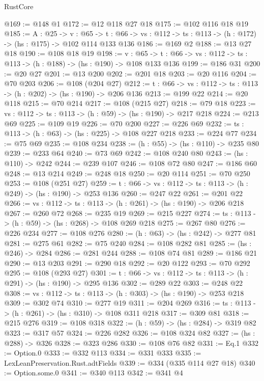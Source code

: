 \begin{lexlean}{RustCore}
\begin{coremodule}
@169 := @148 @1
@172 := @12 @118 @27 @18
@175 := @102 @116 @18 @19
@185 := {A : @25} ->
  {v : @65} ->
  {t : @66} -> {vs : @112} -> {ts : @113} -> (h : @172) -> (hs : @175) -> @102 @114 @133 @136
@186 := @169 @2
@188 := @13 @27 @18
@190 := @108 @18 @19
@198 := {v : @65} ->
  {t : @66} -> {vs : @112} -> {ts : @113} -> (h : @188) -> (hs : @190) -> @108 @133 @136
@199 := @186 @31
@200 := @20 @27
@201 := @13 @200
@202 := @201 @18
@203 := @20 @116
@204 := @70 @203
@206 := @108 (@204 @27)
@212 := {t : @66} -> {vs : @112} -> {ts : @113} -> (h : @202) -> (hs : @190) -> @206 @136
@213 := @199 @22
@214 := @20 @118
@215 := @70 @214
@217 := @108 (@215 @27)
@218 := @79 @18
@223 := {vs : @112} -> {ts : @113} -> (h : @59) -> (hs : @190) -> @217 @218
@224 := @213 @69
@225 := @109 @19
@226 := @70 @200
@227 := @226 @69
@232 := {ts : @113} -> (h : @63) -> (hs : @225) -> @108 @227 @218
@233 := @224 @77
@234 := @75 @69
@235 := @108 @234
@238 := (h : @55) -> (hs : @110) -> @235 @80
@239 := @233 @64
@240 := @73 @69
@242 := @108 @240 @80
@243 := (hs : @110) -> @242
@244 := @239 @107
@246 := @108 @72 @80
@247 := @186 @60
@248 := @13 @214
@249 := @248 @18
@250 := @20 @114
@251 := @70 @250
@253 := @108 (@251 @27)
@259 := {t : @66} -> {vs : @112} -> {ts : @113} -> (h : @249) -> (hs : @190) -> @253 @136
@260 := @247 @22
@261 := @201 @22
@266 := {vs : @112} -> {ts : @113} -> (h : @261) -> (hs : @190) -> @206 @218
@267 := @260 @72
@268 := @235 @19
@269 := @215 @227
@274 := {ts : @113} -> (h : @59) -> (hs : @268) -> @108 @269 @218
@275 := @267 @80
@276 := @226 @234
@277 := @108 @276
@280 := (h : @63) -> (hs : @242) -> @277 @81
@281 := @275 @61
@282 := @75 @240
@284 := @108 @282 @81
@285 := (hs : @246) -> @284
@286 := @281 @244
@288 := @108 @74 @81
@289 := @186 @21
@290 := @13 @203
@291 := @290 @18
@292 := @20 @122
@293 := @70 @292
@295 := @108 (@293 @27)
@301 := {t : @66} -> {vs : @112} -> {ts : @113} -> (h : @291) -> (hs : @190) -> @295 @136
@302 := @289 @22
@303 := @248 @22
@308 := {vs : @112} -> {ts : @113} -> (h : @303) -> (hs : @190) -> @253 @218
@309 := @302 @74
@310 := @277 @19
@311 := @204 @269
@316 := {ts : @113} -> (h : @261) -> (hs : @310) -> @108 @311 @218
@317 := @309 @81
@318 := @215 @276
@319 := @108 @318
@322 := (h : @59) -> (hs : @284) -> @319 @82
@323 := @317 @57
@324 := @226 @282
@326 := @108 @324 @82
@327 := (hs : @288) -> @326
@328 := @323 @286
@330 := @108 @76 @82
@331 := Eq.{1}
@332 := Option.{0}
@333 := @332 @113
@334 := @331 @333
@335 := LexLeanPreservation.Rust.adtFields
@339 := @334 (@335 @114 @27 @18)
@340 := Option.some.{0}
@341 := @340 @113
@342 := @341 @4

\end{coremodule}
\end{lexlean}
